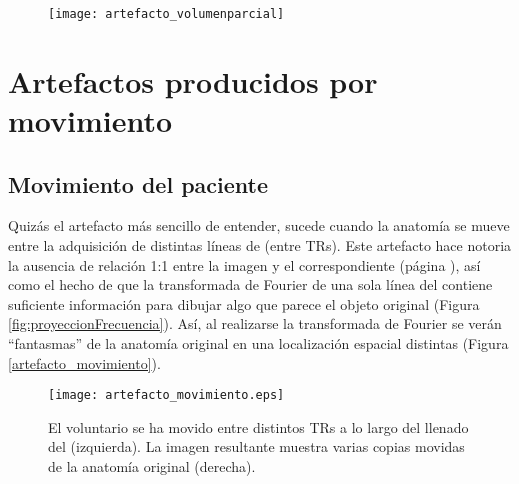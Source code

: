 \begin{figure}[htb]
 \begin{figg}
   \texttt{[image: artefacto\_volumenparcial]}
   \caption{\figurapendiente}
 \label{fig:artefacto_volumenparcial}
 \end{figg}
\end{figure}

\section{Artefactos producidos por movimiento}
\subsection{Movimiento del paciente}
Quizás el artefacto más sencillo de entender, sucede cuando la anatomía se mueve entre la adquisición de distintas líneas de \espaciok (entre TRs). Este artefacto hace notoria la ausencia de relación 1:1 entre la imagen y el \espaciok correspondiente (página \pageref{sec:espaciok}), así como el hecho de que la transformada de Fourier de una sola línea del \espaciok contiene suficiente información para dibujar algo que parece el objeto original (Figura \ref{fig:proyeccionFrecuencia}). Así, al realizarse la transformada de Fourier se verán ``fantasmas'' de la anatomía original en una localización espacial distintas (Figura \ref{artefacto_movimiento}).

\begin{figure}[htb]
 \begin{figg}
   \texttt{[image: artefacto\_movimiento.eps]}
   \caption{El voluntario se ha movido entre distintos TRs a lo largo del llenado del \espaciok (izquierda). La imagen resultante muestra varias copias movidas de la anatomía original (derecha).}
 \label{fig:artefacto_movimiento}
 \end{figg}
\end{figure}
 

